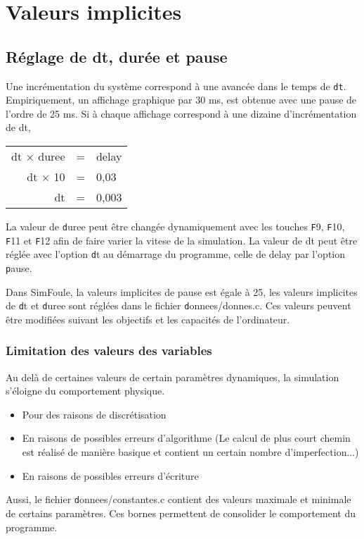 %
\section{Valeurs implicites}
%
%
\subsection{Réglage de dt, durée et pause}
Une incrémentation du système correspond à une avancée dans le temps de \texttt{dt}.
Empiriquement, un affichage graphique par 30 ms, est obtenue avec une pause de l'ordre de 25 ms. Si à chaque affichage correspond à une dizaine d'incrémentation de dt, 
\begin{center}
	\begin{tabular}{rcl}
	dt $\times$ duree & = & delay\\
	dt $\times$ 10 & = & 0,03\\
	dt & = & 0,003\\
	\end{tabular}
\end{center}
La valeur de {\texttt duree} peut être changée dynamiquement avec les touches {\texttt F9}, {\texttt F10}, {\texttt F11} et {\texttt F12} afin de faire varier la vitese de la simulation. La valeur de dt peut être réglée avec l'option {\texttt dt} au démarrage du programme, celle de delay par l'option {\texttt pause}.

Dans SimFoule, la valeurs implicites de pause est égale à 25, les valeurs implicites de {\texttt dt} et {\texttt duree} sont réglées dans le fichier {\texttt donnees/donnes.c}. Ces valeurs peuvent être modifiées suivant les objectifs et les capacités de l'ordinateur.
%
%
%
%
%
\subsubsection{Limitation des valeurs des variables}
%
Au delà de certaines valeurs de certain paramètres dynamiques, la simulation s'éloigne du comportement physique.
\begin{itemize}[label=, leftmargin=2cm]
\item Pour des raisons de discrétisation
\item En raisons de possibles erreurs d'algorithme (Le calcul de plus court chemin est réalisé de manière basique et contient un certain nombre d'imperfection...)
\item En raisons de possibles erreurs d'écriture
\end{itemize}
%
Aussi, le fichier {\texttt donnees/constantes.c} contient des valeurs maximale et minimale de certains paramètres. Ces bornes permettent de consolider le comportement du programme.
%
